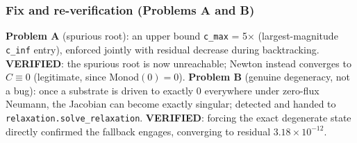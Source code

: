 \documentclass[11pt]{article}
\newcommand{\verified}{\textcolor{green!45!black}{\textbf{VERIFIED}}}
\newcommand{\code}[1]{\texttt{#1}}
\begin{document}
\subsubsection{Fix and re-verification (Problems A and B)}
\label{sec:problemAB}
\textbf{Problem A} (spurious root): an upper bound \code{c\_max} = 5$\times$
(largest-magnitude \code{c\_inf} entry), enforced jointly with residual
decrease during backtracking. \verified{}: the spurious root is now
unreachable; Newton instead converges to $C\equiv0$ (legitimate, since
Monod$(0){=}0$). \textbf{Problem B} (genuine degeneracy, not a bug): once a
substrate is driven to exactly 0 everywhere under zero-flux Neumann, the
Jacobian can become exactly singular; detected and handed to
\code{relaxation.solve\_relaxation}. \verified{}: forcing the exact degenerate
state directly confirmed the fallback engages, converging to residual
$3.18\times10^{-12}$.
\end{document}
